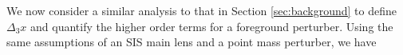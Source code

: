 We now consider a similar analysis to that in Section \ref{sec:background} to define $\Delta_3 x$ and quantify the higher order terms for a foreground perturber. Using the same assumptions of an SIS main lens and a point mass perturber, we have
  